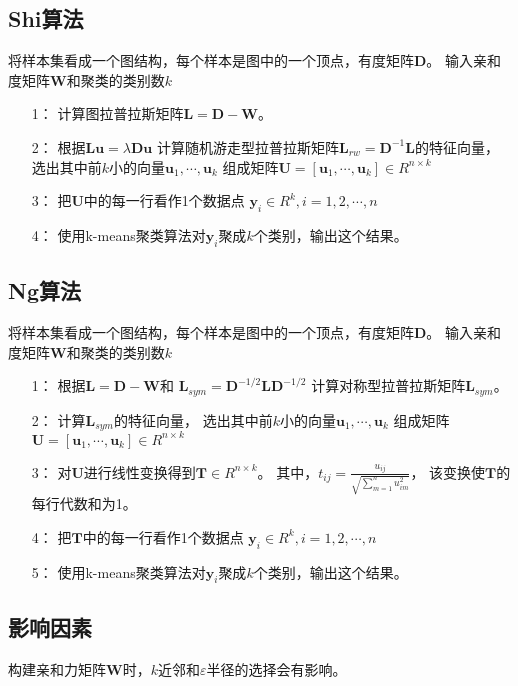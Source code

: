 \documentclass{article}
\begin{document}
\subsection*{Shi算法}
将样本集看成一个图结构，每个样本是图中的一个顶点，有度矩阵$\pmb{D}$。
输入亲和度矩阵$\pmb{W}$和聚类的类别数$k$
\begin{itemize}
	\item[1：] 计算图拉普拉斯矩阵$\pmb{L} = \pmb{D} - \pmb{W}$。
	\item[2：] 根据$\pmb{L}\pmb{u} = \lambda \pmb{D}\pmb{u}$
	计算随机游走型拉普拉斯矩阵${\pmb{L}_{rw}} = {\pmb{D}^{ - 1}}\pmb{L}$的特征向量，
	选出其中前$k$小的向量${{\pmb{u} _1}, \cdots ,{\pmb{u} _k}}$
	组成矩阵$\pmb{U} = \left[ {{\pmb{u}_1}, \cdots ,{\pmb{u}_k}} \right] \in {R^{n \times k}}$
	\item[3：] 把$\pmb{U}$中的每一行看作1个数据点
	${\pmb{y}_i} \in {R^k},i = 1,2, \cdots ,n$
	\item[4：] 使用k-means聚类算法对${\pmb{y}_i}$聚成$k$个类别，输出这个结果。
\end{itemize}

\subsection*{Ng算法}
将样本集看成一个图结构，每个样本是图中的一个顶点，有度矩阵$\pmb{D}$。
输入亲和度矩阵$\pmb{W}$和聚类的类别数$k$
\begin{itemize}
	\item[1：] 根据$\pmb{L} = \pmb{D} - \pmb{W}$和
	${\pmb{L}_{sym}} = {\pmb{D}^{ - 1/2}}\pmb{L}{\pmb{D}^{ - 1/2}}$
	计算对称型拉普拉斯矩阵${\pmb{L}_{sym}}$。
	\item[2：] 计算${\pmb{L}_{sym}}$的特征向量，
	选出其中前$k$小的向量${{\pmb{u} _1}, \cdots ,{\pmb{u} _k}}$
	组成矩阵
	$\pmb{U} = \left[ {{\pmb{u}_1}, \cdots ,{\pmb{u}_k}} \right] \in {R^{n \times k}}$
	\item[3：] 对$\pmb{U}$进行线性变换得到$\pmb{T} \in {R^{n \times k}}$。
	其中，${t_{ij}} = \frac{{{u_{ij}}}}{{\sqrt {\sum\nolimits_{m = 1}^n {u_{im}^2} } }}$，
	该变换使$\pmb{T}$的每行代数和为1。
	\item[4：] 把$\pmb{T}$中的每一行看作1个数据点
	${\pmb{y}_i} \in {R^k},i = 1,2, \cdots ,n$
	\item[5：] 使用k-means聚类算法对${\pmb{y}_i}$聚成$k$个类别，输出这个结果。
\end{itemize}

\subsection*{影响因素}
构建亲和力矩阵$\pmb{W}$时，$k$近邻和$\varepsilon$半径的选择会有影响。
\end{document}
